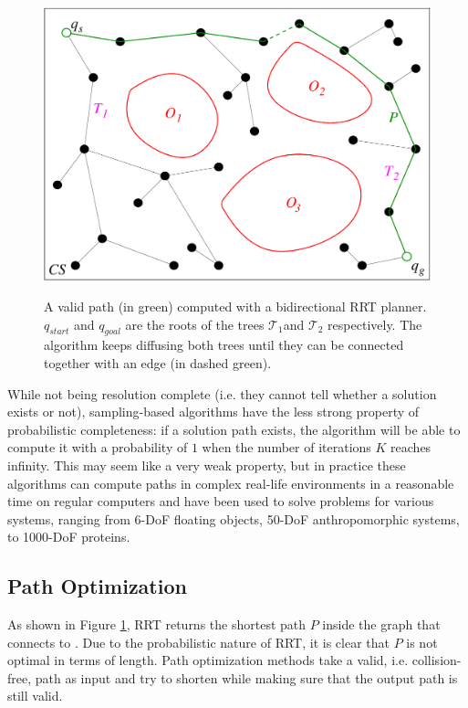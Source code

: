 \begin{figure}
  \centering
      {\includegraphics[width = 0.8\linewidth]
        {src/chap1-path-optimization/rrt.pdf}}
      \caption{A valid path (in green) computed with a bidirectional
        RRT planner. $q_{start}$ and $q_{goal}$ are the roots of the
        trees $\mathcal{T}_{1}$and $\mathcal{T}_{2}$ respectively. The
        algorithm keeps diffusing both trees until they can be
        connected together with an edge (in dashed green).}
      \label{fig:chap1-rrt}
\end{figure}

While not being resolution complete (i.e. they cannot tell whether a
solution exists or not), sampling-based algorithms have the less
strong property of probabilistic completeness: if a solution path
exists, the algorithm will be able to compute it with a probability of
$1$ when the number of iterations $K$ reaches infinity. This may seem
like a very weak property, but in practice these algorithms can
compute paths in complex real-life environments in a reasonable time
on regular computers and have been used to solve problems for various
systems, ranging from 6-DoF floating objects, 50-DoF anthropomorphic
systems, to 1000-DoF proteins.

\subsection{Path Optimization}
\label{subsec:chap1-path-optimization}

As shown in Figure \ref{fig:chap1-rrt}, RRT returns the shortest path
$P$ inside the graph that connects  to . Due to
the probabilistic nature of RRT, it is clear that $P$ is not optimal
in terms of length. Path optimization methods take a valid,
i.e. collision-free, path as input and try to shorten while making
sure that the output path is still valid.

